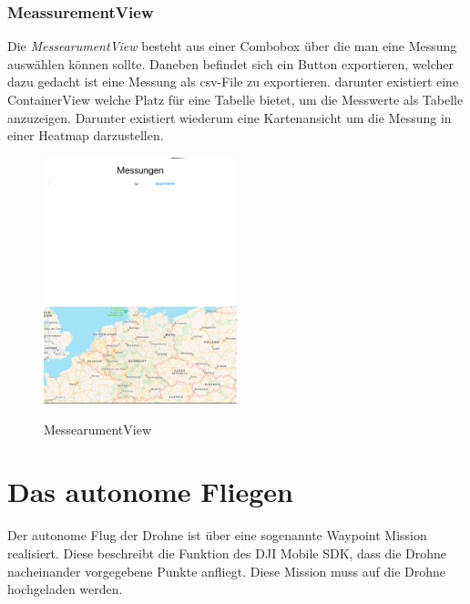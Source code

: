 \subsubsection{MeassurementView}
Die \textit{MessearumentView} besteht aus einer Combobox über die man eine Messung auswählen können sollte. Daneben befindet sich ein Button exportieren, welcher dazu gedacht ist eine Messung als csv-File zu exportieren.
\newline
darunter existiert eine ContainerView welche Platz für eine Tabelle bietet, um die Messwerte als Tabelle anzuzeigen. Darunter existiert wiederum eine Kartenansicht um die Messung in einer Heatmap darzustellen. 
\newline
\begin{figure}[H]
	\begin{center}
		{\includegraphics[width=0.5\textwidth]{images/MessearumentView.png}}
		\caption{MessearumentView}
	\end{center}
\end{figure}

\section{Das autonome Fliegen}
Der autonome Flug der Drohne ist über eine sogenannte Waypoint Mission realisiert. Diese beschreibt die Funktion des DJI Mobile SDK, dass die Drohne nacheinander vorgegebene Punkte anfliegt. Diese Mission muss auf die Drohne hochgeladen werden.
\newline
